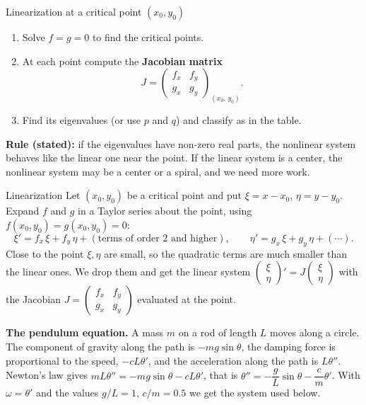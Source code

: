 \begin{methodbox}{Linearization at a critical point $(x_0,y_0)$}
\begin{enumerate}
  \item Solve $f=g=0$ to find the critical points.
  \item At each point compute the \textbf{Jacobian matrix}
  \[ J = \begin{pmatrix}f_x & f_y\\ g_x & g_y\end{pmatrix}_{(x_0,\,y_0)}. \]
  \item Find its eigenvalues (or use $p$ and $q$) and classify as in the table.
\end{enumerate}
\textbf{Rule (stated):} if the eigenvalues have non-zero real parts, the nonlinear system behaves like the linear one near the point. If the linear system is a center, the nonlinear system may be a center or a spiral, and we need more work.
\end{methodbox}

\begin{derivbox}{Linearization}
Let $(x_0,y_0)$ be a critical point and put $\xi = x - x_0$, $\eta = y - y_0$. Expand $f$ and $g$ in a Taylor series about the point, using $f(x_0,y_0) = g(x_0,y_0) = 0$:
\[ \xi' = f_x\,\xi + f_y\,\eta + (\text{terms of order } 2\text{ and higher}),\qquad \eta' = g_x\,\xi + g_y\,\eta + (\cdots). \]
Close to the point $\xi,\eta$ are small, so the quadratic terms are much smaller than the linear ones. We drop them and get the linear system $\begin{pmatrix}\xi\\\eta\end{pmatrix}' = J\begin{pmatrix}\xi\\\eta\end{pmatrix}$ with the Jacobian $J = \begin{pmatrix}f_x&f_y\\g_x&g_y\end{pmatrix}$ evaluated at the point.

\textbf{The pendulum equation.} A mass $m$ on a rod of length $L$ moves along a circle. The component of gravity along the path is $-mg\sin\theta$, the damping force is proportional to the speed, $-cL\theta'$, and the acceleration along the path is $L\theta''$. Newton's law gives $mL\theta'' = -mg\sin\theta - cL\theta'$, that is $\theta'' = -\dfrac gL\sin\theta - \dfrac cm\theta'$. With $\omega = \theta'$ and the values $g/L = 1$, $c/m = 0.5$ we get the system used below.
\end{derivbox}


